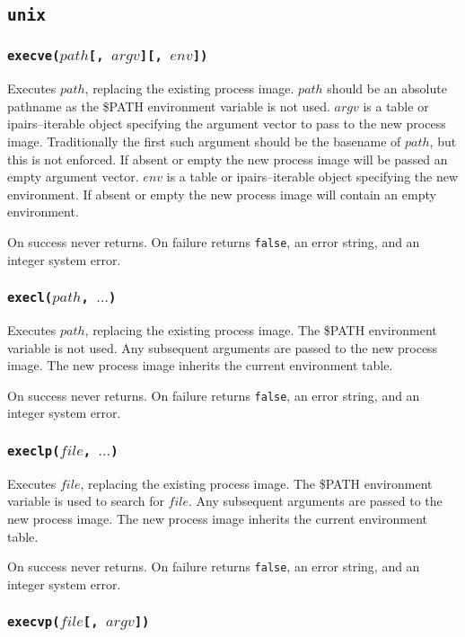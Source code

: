 \documentclass[11pt, oneside]{memoir}
\newcommand*{\false}[0]{\texttt{false}\xspace}
\newcommand*{\fn}[1]{\texttt{#1}\xspace}
\newcounter{toccols}
\newenvironment{Module}[1]{
	\subsection{\texttt{#1}}
	\addtocontents{toc}{
		\protect\begin{multicols}{\value{toccols}}
	}
}{
	\addtocontents{toc}{\protect\end{multicols}}
}
\begin{document}
\begin{Module}{unix}
\subsubsection[\fn{execve}]{\fn{execve($path$[, $argv$][, $env$])}}

Executes $path$, replacing the existing process image. $path$ should be an absolute pathname as the \$PATH environment variable is not used. $argv$ is a table or ipairs--iterable object specifying the argument vector to pass to the new process image. Traditionally the first such argument should be the basename of $path$, but this is not enforced. If absent or empty the new process image will be passed an empty argument vector. $env$ is a table or ipairs--iterable object specifying the new environment. If absent or empty the new process image will contain an empty environment.

On success never returns. On failure returns \false, an error string, and an integer system error.

\subsubsection[\fn{execl}]{\fn{execl($path$, $\ldots$)}}

Executes $path$, replacing the existing process image. The \$PATH environment variable is not used. Any subsequent arguments are passed to the new process image. The new process image inherits the current environment table.

On success never returns. On failure returns \false, an error string, and an integer system error.

\subsubsection[\fn{execlp}]{\fn{execlp($file$, $\ldots$)}}

Executes $file$, replacing the existing process image. The \$PATH environment variable is used to search for $file$. Any subsequent arguments are passed to the new process image. The new process image inherits the current environment table.

On success never returns. On failure returns \false, an error string, and an integer system error.

\subsubsection[\fn{execvp}]{\fn{execvp($file$[, $argv$])}}


\end{Module}
\end{document}
